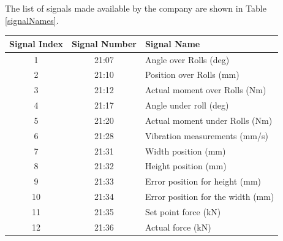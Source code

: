 \documentclass{article}
\begin{document}
The list of signals made available by the company are shown in Table \ref{signalNames}.
\begin{center}
\begin{tabular}{ |c|c|l| }
 \hline
Signal Index & Signal Number & Signal Name \\ 
 \hline
1 & 21:07 & Angle over Rolls (deg) \\
 \hline
2 & 21:10 & Position over Rolls (mm) \\
 \hline
3 & 21:12 & Actual moment over Rolls (Nm) \\
 \hline
4 & 21:17 & Angle under roll (deg) \\
 \hline
5 & 21:20 & Actual moment under Rolls (Nm) \\
 \hline
6 & 21:28 & Vibration measurements (mm/s) \\ 
 \hline              
7 & 21:31 & Width position (mm) \\
 \hline
8 & 21:32 & Height position (mm) \\
 \hline
9 & 21:33 & Error position for height (mm) \\
 \hline
10 & 21:34 & Error position for the width (mm) \\
 \hline
11 & 21:35 & Set point force (kN) \\
 \hline
12 & 21:36 & Actual force (kN) \\
 \hline
\end{tabular}
\label{signalNames}
\end{center}
\end{document}
